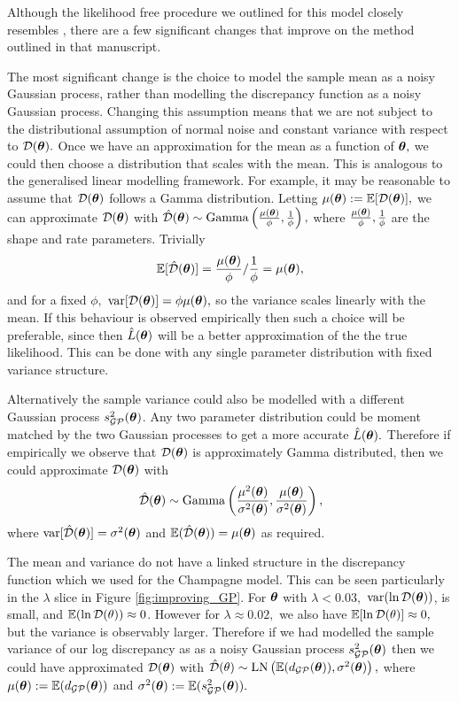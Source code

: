 Although the likelihood free procedure we outlined for this model closely
resembles \cite{gutmann_bayesian_2016}, there are a few significant changes
that improve on the method outlined in that manuscript.

The most significant change is the choice to model the sample mean as a noisy
Gaussian process, rather than modelling the discrepancy function as a noisy
Gaussian process. 
Changing this assumption means that we are not subject to the distributional 
assumption of normal noise and constant variance 
with respect to $\mathcal{D}(\bm{\theta}).$ Once we have an approximation for the mean
as a function of $\bm{\theta},$ we could then choose a distribution that scales
with the mean. This is analogous to the generalised linear modelling framework.
For example, it may be reasonable to assume that $\mathcal{D}(\bm{\theta})$ follows a
Gamma distribution. Letting $\mu(\bm{\theta}) := \operatorname{\mathbb{E}}[\mathcal{D}(\bm{\theta})],$ we can
approximate $\mathcal{D}(\bm{\theta})$ with
$
    \hat{\mathcal{D}}(\bm{\theta})
    \sim \mathrm{Gamma}\left(\frac{\mu(\bm{\theta})}{\phi}, \frac{1}{\phi}\right),
$
where $\frac{\mu(\bm{\theta})}{\phi}, \frac{1}{\phi}$ are the shape and rate
parameters. Trivially
$$
    \operatorname{\mathbb{E}}[\hat{\mathcal{D}}(\bm{\theta})]
    = \frac{\mu(\bm{\theta})}{\phi}/\frac{1}{\phi} = \mu(\bm{\theta}),
$$
and for a fixed $\phi,$ $\operatorname{var}[\mathcal{D}(\bm{\theta})] = \phi\mu(\bm{\theta}),$ so the variance
scales linearly with the mean. If this behaviour is observed
empirically then such a choice will be preferable, since then
$\hat{L}(\bm{\theta})$ will be a better approximation of the the
true likelihood. This can be done with any single parameter distribution with
fixed variance structure.

Alternatively the sample variance could also be modelled with a different
Gaussian process $s^2_{\mathcal{GP}}(\bm{\theta})$.
Any two parameter distribution could be moment matched by
the two Gaussian processes to get a more accurate $\hat{L}(\bm{\theta}).$
Therefore if empirically we observe that $\mathcal{D}(\bm{\theta})$ is approximately Gamma
distributed, then we could approximate $\mathcal{D}(\bm{\theta})$ with
$$
    \hat{\mathcal{D}}(\bm{\theta})
    \sim \mathrm{Gamma}\left(
    \frac{\mu^2(\bm{\theta})}{\sigma^2(\bm{\theta})},
    \frac{\mu(\bm{\theta})}{\sigma^2(\bm{\theta})}
    \right),
$$ where $\operatorname{var}[\hat{\mathcal{D}}(\bm{\theta})] = \sigma^2(\bm{\theta})$ and
$\operatorname{\mathbb{E}}(\hat{\mathcal{D}}(\bm{\theta})) =\mu(\bm{\theta})$ as required.

The mean and variance do not have a linked structure in the discrepancy function
which we used for the Champagne model.
This can be seen particularly in the $\lambda$ slice in Figure
\ref{fig:improving_GP}.
For $\bm{\theta}$ with $\lambda < 0.03,$ $\operatorname{var}(\ln\mathcal{D}(\bm{\theta}))$, is small, and
$\operatorname{\mathbb{E}}(\ln\mathcal{D}(\theta))\approx 0$. However for $\lambda \approx 0.02,$ we also have
$\operatorname{\mathbb{E}}[\ln\mathcal{D}(\theta)] \approx 0,$ but the variance is observably larger. Therefore
if we had modelled the sample variance of our log discrepancy as
as a noisy Gaussian process $s^2_{\mathcal{GP}}(\bm{\theta})$ then we could have approximated
$\mathcal{D}(\bm{\theta})$ with
$\hat{\mathcal{D}}(\theta) \sim \operatorname{LN}\left(\operatorname{\mathbb{E}}(d_{\mathcal{GP}}(\bm{\theta})), \sigma^2(\bm{\theta})\right),$
where $\mu(\bm{\theta}) := \operatorname{\mathbb{E}}(d_{\mathcal{GP}}(\bm{\theta}))$ and
$\sigma^2(\bm{\theta}) := \operatorname{\mathbb{E}}(s^2_{\mathcal{GP}}(\bm{\theta})).$

